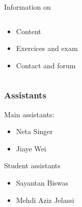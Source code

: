 
\begin{frame}[plain]
    \titlepage
\end{frame}

\pagestyle{empty} 



\begin{frame}{Information on} 

    \begin{columns}
      \begin{column}{.5\textwidth}
        \begin{itemize}
        \item Content
         \item Exercices and exam
         \item Contact and forum
         \end{itemize}
       \end{column}
       \begin{column}{.5\textwidth}
       \end{column}
       
    \end{columns}
      
    
  
  \end{frame}
   



   \begin{frame}

     \begin{columns}
       \begin{column}{0.4\textwidth }                 
     \frametitle{Assistants}
     Main assistants:
     \begin{itemize}
     \item Neta Singer
     \item Jiaye Wei
     \end{itemize}

     \bigskip 
     
     Student assistants 
     \begin{itemize}
     \item Sayantan Biswas
     \item Mehdi Aziz Jelassi 
     \end{itemize}
   \end{column}
   \begin{column}{0.4\textwidth }
   \end{column}
 \end{columns}
\end{frame}

